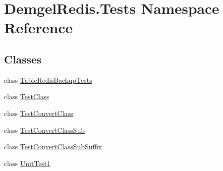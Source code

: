 \hypertarget{namespace_demgel_redis_1_1_tests}{}\section{Demgel\+Redis.\+Tests Namespace Reference}
\label{namespace_demgel_redis_1_1_tests}
\subsection*{Classes}
\begin{DoxyCompactItemize}
\item 
class \hyperlink{class_demgel_redis_1_1_tests_1_1_table_redis_backup_tests}{Table\+Redis\+Backup\+Tests}
\item 
class \hyperlink{class_demgel_redis_1_1_tests_1_1_test_class}{Test\+Class}
\item 
class \hyperlink{class_demgel_redis_1_1_tests_1_1_test_convert_class}{Test\+Convert\+Class}
\item 
class \hyperlink{class_demgel_redis_1_1_tests_1_1_test_convert_class_sub}{Test\+Convert\+Class\+Sub}
\item 
class \hyperlink{class_demgel_redis_1_1_tests_1_1_test_convert_class_sub_suffix}{Test\+Convert\+Class\+Sub\+Suffix}
\item 
class \hyperlink{class_demgel_redis_1_1_tests_1_1_unit_test1}{Unit\+Test1}
\end{DoxyCompactItemize}
